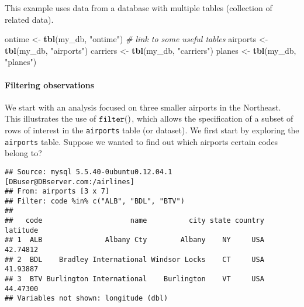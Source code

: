 \documentclass[]{article}
\newenvironment{Shaded}{\begin{snugshade}}{\end{snugshade}}
\newcommand{\KeywordTok}[1]{\textcolor[rgb]{0.13,0.29,0.53}{\textbf{{#1}}}}
\newcommand{\StringTok}[1]{\textcolor[rgb]{0.31,0.60,0.02}{{#1}}}
\newcommand{\CommentTok}[1]{\textcolor[rgb]{0.56,0.35,0.01}{\textit{{#1}}}}
\newcommand{\NormalTok}[1]{{#1}}
\begin{document}
This example uses data from a database with multiple tables (collection
of related data).

\begin{Shaded}
\begin{Highlighting}[]
\NormalTok{ontime <-}\StringTok{ }\KeywordTok{tbl}\NormalTok{(my_db, }\StringTok{"ontime"}\NormalTok{)   }\CommentTok{# link to some useful tables}
\NormalTok{airports <-}\StringTok{ }\KeywordTok{tbl}\NormalTok{(my_db, }\StringTok{"airports"}\NormalTok{)}
\NormalTok{carriers <-}\StringTok{ }\KeywordTok{tbl}\NormalTok{(my_db, }\StringTok{"carriers"}\NormalTok{)}
\NormalTok{planes <-}\StringTok{ }\KeywordTok{tbl}\NormalTok{(my_db, }\StringTok{"planes"}\NormalTok{)}
\end{Highlighting}
\end{Shaded}

\paragraph{Filtering observations}\label{filtering-observations}

We start with an analysis focused on three smaller airports in the
Northeast. This illustrates the use of ${\tt filter()}$, which allows
the specification of a subset of rows of interest in the
\texttt{airports} table (or dataset). We first start by exploring the
\texttt{airports} table. Suppose we wanted to find out which airports
certain codes belong to?

\begin{Shaded}
\end{Shaded}

\begin{verbatim}
## Source: mysql 5.5.40-0ubuntu0.12.04.1 [DBuser@DBserver.com:/airlines]
## From: airports [3 x 7]
## Filter: code %in% c("ALB", "BDL", "BTV") 
## 
##   code                     name          city state country latitude
## 1  ALB               Albany Cty        Albany    NY     USA 42.74812
## 2  BDL    Bradley International Windsor Locks    CT     USA 41.93887
## 3  BTV Burlington International    Burlington    VT     USA 44.47300
## Variables not shown: longitude (dbl)
\end{verbatim}
\end{document}
